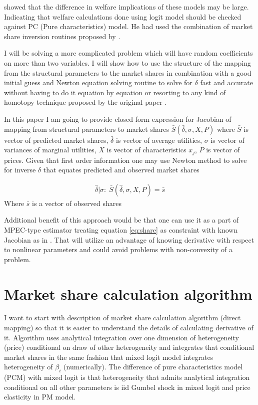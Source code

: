 \documentclass[12pt,letterpaper]{article}
\begin{document}
	
	\cite{song2007measuring} showed that the difference in welfare implications of these models may be large. Indicating that welfare calculations done using logit model should be checked against PC (Pure characteristics) model. He had used the combination of market share inversion routines proposed by \cite{berry2007pure}.
	
	I will be solving a more complicated problem which will have random coefficients on more than two variables. I will show how to use the structure of the mapping from the structural parameters to the market shares in combination with a good initial guess and Newton equation solving routine to solve for $\bar \delta$ fast and accurate without having to do it equation by equation or resorting to any kind of homotopy technique proposed by the original paper \cite{berry2007pure}.
	
	In this paper I am going to provide closed form expression for Jacobian of mapping from structural parameters to market shares $\bar S(\bar \delta,\sigma,X,P)$ where $\bar S$ is vector of predicted market shares, $\bar \delta$ is vector of average utilities, $\sigma$ is vector of variances of marginal utilities, $X$ is vector of characteristics $x_j$, $P$ is vector of prices. Given that first order information one may use Newton method to solve for inverse $\delta$ that equates predicted and observed market shares
	
	\begin{align}
	\hat\delta|\sigma:\; \bar S(\hat\delta,\sigma,X,P) = \bar s \label{eq:share}
	\end{align}
	Where $\bar s$ is a vector of observed shares
	
	Additional benefit of this approach would be that one can use it as a part of MPEC-type estimator treating equation \ref{eq:share} as constraint with known Jacobian as in \cite{dube2012improving}. That will utilize an  advantage of knowing derivative with respect to nonlinear parameters and could avoid problems with non-convexity of a problem.
	
	\section{Market share calculation algorithm}
	
	I want to start with description of market share calculation algorithm (direct mapping) so that it is easier to understand the details of calculating derivative of it. Algorithm uses analytical integration over one dimension of heterogeneity (price) conditional on draw of other heterogeneity and integrates that conditional market shares in the same fashion that mixed logit model integrates heterogeneity of $\beta_i$ (numerically). The difference of pure characteristics model (PCM) with mixed logit is that heterogeneity that admits analytical integration conditional on all other parameters is iid Gumbel shock in mixed logit and price elasticity in PM model. 
	
\end{document}
